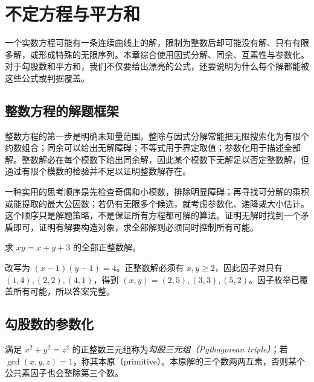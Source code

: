 \setcounter{chapter}{9} %
\chapter{不定方程与平方和}
\label{ch:diophantine}

一个实数方程可能有一条连续曲线上的解，限制为整数后却可能没有解、只有有限多解，或形成特殊的无限序列。本章综合使用因式分解、同余、互素性与参数化。对于勾股数和平方和，我们不仅要给出漂亮的公式，还要说明为什么每个解都能被这些公式或判据覆盖。

\section{整数方程的解题框架}

整数方程的第一步是明确未知量范围。整除与因式分解常能把无限搜索化为有限个约数组合；同余可以给出无解障碍；不等式用于界定取值；参数化用于描述全部解。整数解必在每个模数下给出同余解，因此某个模数下无解足以否定整数解，但通过有限个模数的检验并不足以证明整数解存在。

一种实用的思考顺序是先检查奇偶和小模数，排除明显障碍；再寻找可分解的乘积或能提取的最大公因数；若仍有无限多个候选，就考虑参数化、递降或大小估计。这个顺序只是解题策略，不是保证所有方程都可解的算法。证明无解时找到一个矛盾即可，证明有解要构造对象，求全部解则必须同时控制所有可能。

\begin{example}
求 $xy=x+y+3$ 的全部正整数解。
\end{example}
\begin{solve}
改写为 $(x-1)(y-1)=4$。正整数解必须有 $x,y\ge2$，因此因子对只有 $(1,4),(2,2),(4,1)$，得到 $(x,y)=(2,5),(3,3),(5,2)$。因子枚举已覆盖所有可能，所以答案完整。
\end{solve}

\section{勾股数的参数化}

满足 $x^2+y^2=z^2$ 的正整数三元组称为\emph{勾股三元组（Pythagorean triple）}；若 $\gcd(x,y,z)=1$，称其本原（primitive）。本原解的三个数两两互素，否则某个公共素因子也会整除第三个数。

